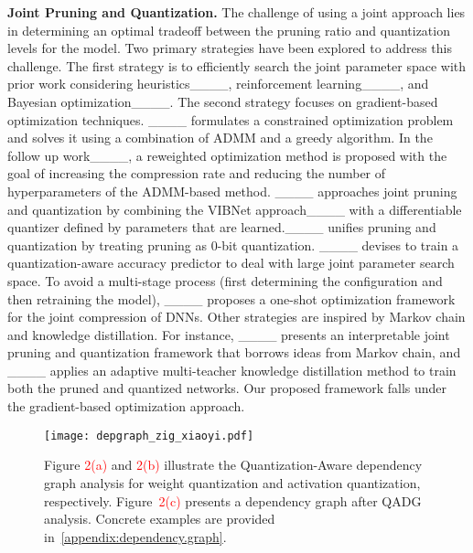 \smallskip
\noindent \textbf{Joint Pruning and Quantization.} The challenge of using a joint approach lies in determining an optimal tradeoff between the pruning ratio and quantization levels for the model. Two primary strategies have been explored to address this challenge. The first strategy is to efficiently search the joint parameter space with prior work considering heuristics____, reinforcement learning____, and Bayesian optimization____. The second strategy focuses on gradient-based optimization techniques. ____ formulates a constrained optimization problem and solves it using a combination of ADMM and a greedy algorithm. In the follow up work____, a reweighted optimization method is proposed with the goal of increasing the compression rate and reducing the number of hyperparameters of the ADMM-based method. ____ approaches joint pruning and quantization by combining the VIBNet approach____ with a differentiable quantizer defined by parameters that are learned.____ unifies pruning and quantization by treating pruning as 0-bit quantization. ____ devises to train a quantization-aware accuracy predictor to deal with large joint parameter search space. 
To avoid a multi-stage process (first determining the configuration and then retraining the model), ____ proposes a one-shot optimization framework for the joint compression of DNNs. Other strategies are inspired by Markov chain and knowledge distillation. For instance, ____ presents an interpretable joint pruning and quantization framework that borrows ideas from Markov chain, and ____ applies an adaptive multi-teacher knowledge distillation method to train both the pruned and quantized networks. Our proposed framework falls under the gradient-based optimization approach.

\begin{figure*}[ht]
\centering
\texttt{[image: depgraph\_zig\_xiaoyi.pdf]}
\caption{Figure \textcolor{red}{2(a)} and \textcolor{red}{2(b)} illustrate the Quantization-Aware dependency graph analysis for weight quantization and activation quantization, respectively. Figure~\textcolor{red}{2(c)} presents a dependency graph after QADG analysis. Concrete examples are provided in~\cref{appendix:dependency.graph}.}
\label{fig:graph.analysis}
\end{figure*}

